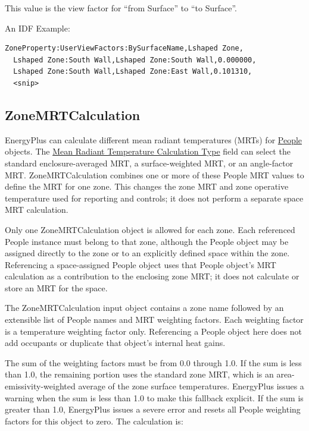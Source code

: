 This value is the view factor for ``from Surface'' to ``to Surface''.

An IDF Example:

\begin{lstlisting}
ZoneProperty:UserViewFactors:BySurfaceName,Lshaped Zone,
  Lshaped Zone:South Wall,Lshaped Zone:South Wall,0.000000,
  Lshaped Zone:South Wall,Lshaped Zone:East Wall,0.101310,
  <snip>
\end{lstlisting}

\subsection{ZoneMRTCalculation}\label{zonemrtcalculation}

EnergyPlus can calculate different mean radiant temperatures (MRTs) for \hyperref[people]{People} objects. The \hyperref[field-mean-radiant-temperature-calculation-type]{Mean Radiant Temperature Calculation Type} field can select the standard enclosure-averaged MRT, a surface-weighted MRT, or an angle-factor MRT. ZoneMRTCalculation combines one or more of these People MRT values to define the MRT for one zone. This changes the zone MRT and zone operative temperature used for reporting and controls; it does not perform a separate space MRT calculation.

Only one ZoneMRTCalculation object is allowed for each zone. Each referenced People instance must belong to that zone, although the People object may be assigned directly to the zone or to an explicitly defined space within the zone. Referencing a space-assigned People object uses that People object's MRT calculation as a contribution to the enclosing zone MRT; it does not calculate or store an MRT for the space.

The ZoneMRTCalculation input object contains a zone name followed by an extensible list of People names and MRT weighting factors. Each weighting factor is a temperature weighting factor only. Referencing a People object here does not add occupants or duplicate that object's internal heat gains.

The sum of the weighting factors must be from 0.0 through 1.0. If the sum is less than 1.0, the remaining portion uses the standard zone MRT, which is an area-emissivity-weighted average of the zone surface temperatures. EnergyPlus issues a warning when the sum is less than 1.0 to make this fallback explicit. If the sum is greater than 1.0, EnergyPlus issues a severe error and resets all People weighting factors for this object to zero. The calculation is:

